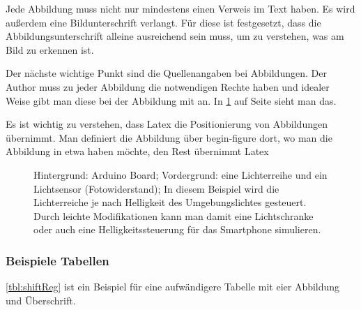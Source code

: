 Jede Abbildung muss nicht nur mindestens einen Verweis im Text haben. Es wird außerdem eine Bildunterschrift verlangt. Für diese ist festgesetzt, dass die Abbildungsunterschrift alleine ausreichend sein muss, um zu verstehen, was am Bild zu erkennen ist. 

Der nächste wichtige Punkt sind die Quellenangaben bei Abbildungen. Der Author muss zu jeder Abbildung die notwendigen Rechte haben und idealer Weise gibt man diese bei der Abbildung mit an. In \cref{fig:ArduExample} auf Seite \pageref{fig:ArduExample} sieht man das.

Es ist wichtig zu verstehen, dass Latex die Positionierung von Abbildungen übernimmt. Man definiert die Abbildung über begin-figure dort, wo man die Abbildung in etwa haben  möchte, den Rest übernimmt Latex

\begin{figure}[t]
\centering
\caption[Arduino mit Lichtsensor und Lichterkette]{Hintergrund: Arduino Board;
Vordergrund: eine Lichterreihe und ein Lichtsensor (Fotowiderstand); In diesem
Beispiel wird die Lichterreiche je nach Helligkeit des Umgebungslichtes
gesteuert. Durch leichte Modifikationen kann man damit eine Lichtschranke oder
auch eine Helligkeitssteuerung für das Smartphone simulieren.}
\label{fig:ArduExample}
\end{figure}

\subsubsection{Beispiele Tabellen}

\cref{tbl:shiftReg} ist ein Beispiel für eine aufwändigere Tabelle mit eier Abbildung und Überschrift.

